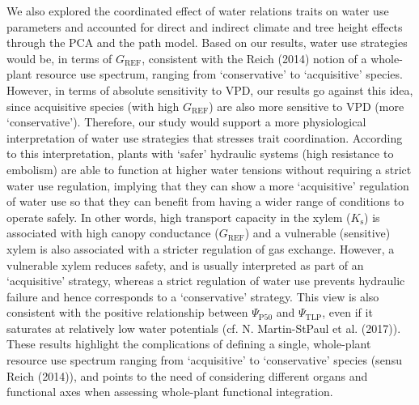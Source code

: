 \documentclass[11pt,twoside]{reedthesis}
\begin{document}
We also explored the coordinated effect of water relations traits on
water use parameters and accounted for direct and indirect climate and
tree height effects through the PCA and the path model. Based on our
results, water use strategies would be, in terms of \(G_{\text{REF}}\),
consistent with the Reich (2014) notion of a whole-plant resource use
spectrum, ranging from `conservative' to `acquisitive' species. However,
in terms of absolute sensitivity to VPD, our results go against this
idea, since acquisitive species (with high \(G_{\text{REF}}\)) are also
more sensitive to VPD (more `conservative'). Therefore, our study would
support a more physiological interpretation of water use strategies that
stresses trait coordination. According to this interpretation, plants
with `safer' hydraulic systems (high resistance to embolism) are able to
function at higher water tensions without requiring a strict water use
regulation, implying that they can show a more `acquisitive' regulation
of water use so that they can benefit from having a wider range of
conditions to operate safely. In other words, high transport capacity in
the xylem (\(K_\text{s}\)) is associated with high canopy conductance
(\(G_{\text{REF}}\)) and a vulnerable (sensitive) xylem is also
associated with a stricter regulation of gas exchange. However, a
vulnerable xylem reduces safety, and is usually interpreted as part of
an `acquisitive' strategy, whereas a strict regulation of water use
prevents hydraulic failure and hence corresponds to a `conservative'
strategy. This view is also consistent with the positive relationship
between \(\Psi_{\text{P50}}\) and \(\Psi_{\text{TLP}}\), even if it
saturates at relatively low water potentials (cf. N. Martin-StPaul et
al. (2017)). These results highlight the complications of defining a
single, whole-plant resource use spectrum ranging from `acquisitive' to
`conservative' species (sensu Reich (2014)), and points to the need of
considering different organs and functional axes when assessing
whole-plant functional integration.\par
\end{document}
